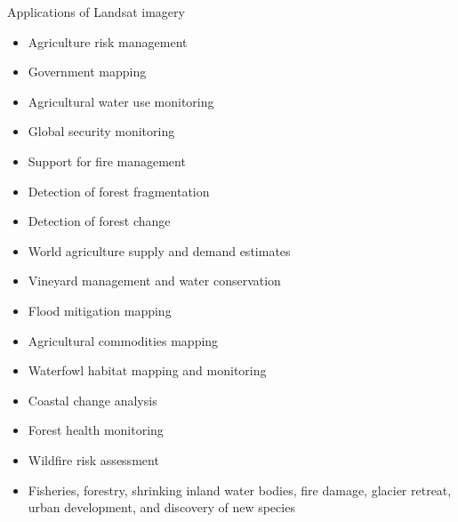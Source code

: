 \documentclass[10pt,dvipsnames,ignorenonframetext,aspectratio=169]{beamer}
\providecommand{\tightlist}{%
  \setlength{\itemsep}{0pt}\setlength{\parskip}{0pt}}
\begin{document}
\begin{frame}{Applications of Landsat imagery}
\protect\hypertarget{applications-of-landsat-imagery}{}
\begin{itemize}
\tightlist
\item
  Agriculture risk management
\item
  Government mapping
\item
  Agricultural water use monitoring
\item
  Global security monitoring
\item
  Support for fire management
\item
  Detection of forest fragmentation
\item
  Detection of forest change
\item
  World agriculture supply and demand estimates
\item
  Vineyard management and water conservation
\item
  Flood mitigation mapping
\item
  Agricultural commodities mapping
\item
  Waterfowl habitat mapping and monitoring
\item
  Coastal change analysis
\item
  Forest health monitoring
\item
  Wildfire risk assessment
\item
  Fisheries, forestry, shrinking inland water bodies, fire damage,
  glacier retreat, urban development, and discovery of new species
\end{itemize}
\end{frame}
\end{document}
